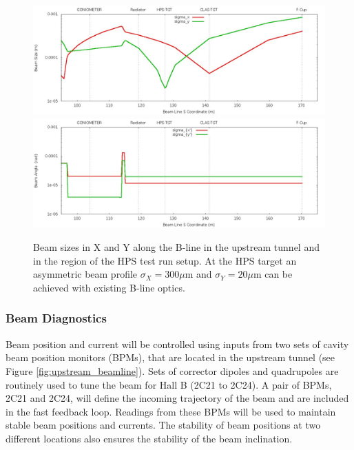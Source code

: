   \begin{figure}[t]
\includegraphics[scale=0.35]{beamline/hps2014_beamsize.jpg}
\includegraphics[scale=0.35]{beamline/hps2014_beamangle.jpg}
\caption{\small{Beam sizes in X and Y along the B-line in the upstream tunnel and in the region of the HPS test run setup. At the HPS target an 
asymmetric beam profile $\sigma_X=300 \mu$m and $\sigma_Y=20 \mu$m can be achieved with existing B-line optics.}}\label{fig:hps2014}
\end{figure}


 
 \subsubsection{Beam Diagnostics}
 \label{setup:beam_dignostics}
 
Beam position and current will be controlled using inputs from two sets of cavity beam position monitors (BPMs), that are located in the 
upstream tunnel (see Figure \ref{fig:upstream_beamline}). 
Sets of corrector dipoles and quadrupoles are routinely used to tune the beam for Hall B (2C21 to 2C24). A pair of BPMs, 2C21 and 2C24, 
will define the incoming trajectory of the beam and are included in the fast feedback loop. Readings from these BPMs will be used to 
maintain stable beam positions and currents. The stability of beam positions at two different locations also ensures the stability of the 
beam inclination.
 
